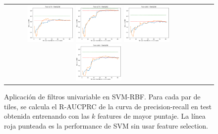 \begin{figure}[h!]
\begin{tabular}{cccc}
\includegraphics[width=0.25\textwidth]{Kap5/rbf_ALL_METHODS_train=b278test=b234}  \includegraphics[width=0.25\textwidth]{Kap5/rbf_ALL_METHODS_train=b278test=b261} 
 \includegraphics[width=0.25\textwidth]{Kap5/rbf_ALL_METHODS_train=b360test=b234}  \includegraphics[width=0.25\textwidth]{Kap5/rbf_ALL_METHODS_train=b360test=b278} 
\end{tabular}
\caption{Aplicación de filtros univariable en SVM-RBF. Para cada par de tiles, se calcula el R-AUCPRC de la curva de precision-recall en test obtenida entrenando con las $k$ features de mayor puntaje. La línea roja punteada es la performance de SVM sin usar feature selection.}
\label{fig:svmk_univariate}
\end{figure}

